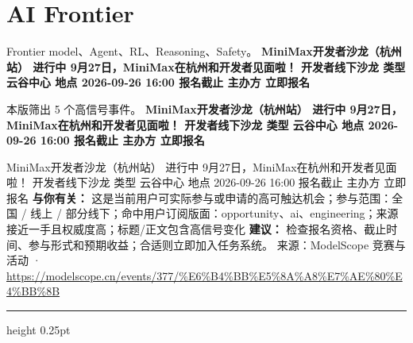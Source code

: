 \documentclass[10.5pt]{ctexart}
\begin{document}
\section*{AI Frontier}
{\color{ormuted} Frontier model、Agent、RL、Reasoning、Safety。}
\vspace{2mm}
{\LARGE\bfseries MiniMax开发者沙龙（杭州站） 进行中 9月27日，MiniMax在杭州和开发者见面啦！ 开发者线下沙龙 类型 云谷中心 地点 2026-09-26 16:00 报名截止 主办方 立即报名}\par
\vspace{1mm}
{\color{ormuted} 本版筛出 5 个高信号事件。}
\vspace{3mm}
{\Large\bfseries MiniMax开发者沙龙（杭州站） 进行中 9月27日，MiniMax在杭州和开发者见面啦！ 开发者线下沙龙 类型 云谷中心 地点 2026-09-26 16:00 报名截止 主办方 立即报名}\par
MiniMax开发者沙龙（杭州站） 进行中 9月27日，MiniMax在杭州和开发者见面啦！ 开发者线下沙龙 类型 云谷中心 地点 2026-09-26 16:00 报名截止 主办方 立即报名
\textbf{与你有关：} 这是当前用户可实际参与或申请的高可触达机会；参与范围：全国 / 线上 / 部分线下；命中用户订阅版面：opportunity、ai、engineering；来源接近一手且权威度高；标题/正文包含高信号变化
\textbf{建议：} 检查报名资格、截止时间、参与形式和预期收益；合适则立即加入任务系统。
{\footnotesize\color{ormuted} 来源：ModelScope 竞赛与活动 · \url{https://modelscope.cn/events/377/%E6%B4%BB%E5%8A%A8%E7%AE%80%E4%BB%8B}}
\vspace{4mm}
\hrule height 0.25pt
\vspace{3mm}
\end{document}
